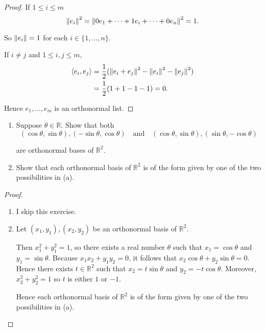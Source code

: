 \begin{proof}
    If $1\leq i\leq m$
    \[
        \left\Vert{e_{i}}\right\Vert^{2} = \left\Vert{0e_{1} + \cdots + 1e_{i} + \cdots + 0e_{n}}\right\Vert^{2} = 1.
    \]

    So $\left\Vert{e_{i}}\right\Vert = 1$ for each $i\in \{ 1,\ldots, n \}$.

    If $i \ne j$ and $1\leq i, j\leq m$,
    \begin{align*}
        \left\langle{e_{i}, e_{j}}\right\rangle & = \frac{1}{2}(\left\Vert{e_{i} + e_{j}}\right\Vert^{2} - \left\Vert{e_{i}}\right\Vert^{2} - \left\Vert{e_{j}}\right\Vert^{2}) \\
                                 & = \frac{1}{2}(1 + 1 - 1 - 1) = 0.
    \end{align*}

    Hence $e_{1}, \ldots, e_{m}$ is an orthonormal list.
\end{proof}
\newpage

\begin{exercise}
    \begin{enumerate}[label={(\alph*)}]
        \item Suppose $\theta\in\mathbb{R}$. Show that both
              \[
                  (\cos\theta, \sin\theta), (-\sin\theta, \cos\theta) \quad\text{and}\quad (\cos\theta, \sin\theta), (\sin\theta, -\cos\theta)
              \]

              are orthonormal bases of $\mathbb{R}^{2}$.
        \item Show that each orthonormal basis of $\mathbb{R}^{2}$ is of the form given by one of the two possibilities in (a).
    \end{enumerate}
\end{exercise}

\begin{proof}
    \begin{enumerate}[label={(\alph*)}]
        \item I skip this exercise.
        \item Let $(x_{1}, y_{1}), (x_{2}, y_{2})$ be an orthonormal basis of $\mathbb{R}^{2}$.

              Then $x_{1}^{2} + y_{1}^{2} = 1$, so there exists a real number $\theta$ such that $x_{1} = \cos\theta$ and $y_{1} = \sin\theta$. Because $x_{1}x_{2} + y_{1}y_{2} = 0$, it follows that $x_{2}\cos\theta + y_{2}\sin\theta = 0$. Hence there exists $t\in\mathbb{R}^{2}$ such that $x_{2} = t\sin\theta$ and $y_{2} = -t\cos\theta$. Moreover, $x_{2}^{2} + y_{2}^{2} = 1$ so $t$ is either $1$ or $-1$.

              Hence each orthonormal basis of $\mathbb{R}^{2}$ is of the form given by one of the two possibilities in (a).
    \end{enumerate}
\end{proof}
\newpage


